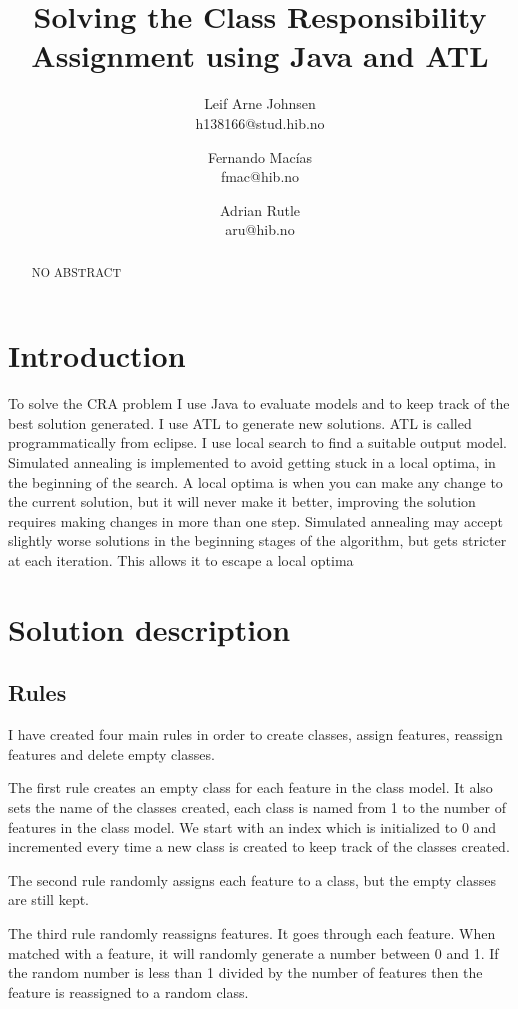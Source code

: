 \documentclass[a4paper]{article}
\title{Solving the Class Responsibility Assignment using Java and ATL}
\author{
Leif Arne Johnsen \\ h138166@stud.hib.no
\and
Fernando Macías \\ fmac@hib.no
\and
Adrian Rutle \\ aru@hib.no
}
\begin{document}
\maketitle

\begin{abstract}
NO ABSTRACT~\cite{Bowman2010}
\end{abstract}


\section{Introduction}

To solve the CRA problem I use Java to evaluate models and to keep track of
the best solution generated.
I use ATL to generate new solutions. ATL is called
programmatically from eclipse.
I use local search to find a suitable output
model.
Simulated annealing is implemented to avoid getting stuck in a local
optima, in the beginning of the search.
A local optima is when you can make
any change to the current solution, but it will never make it better, improving
the solution requires making changes in more than one step.
Simulated
annealing may accept slightly worse solutions in the beginning stages of the
algorithm, but gets stricter at each iteration.
This allows it to escape a local
optima

\section{Solution description}

\subsection{Rules}

I have created four main rules in order to create classes, assign features, reassign features and delete empty classes.

The first rule creates an empty class for each feature in the class model.
It also sets the name of the classes created, each class is named from 1 to the number of features in the class model.
We start with an index which is initialized to 0 and incremented every time a new class is created to keep track of the classes created.

The second rule randomly assigns each feature to a class, but the empty classes are still kept.

The third rule randomly reassigns features.
It goes through each feature.
When matched with a feature, it will randomly generate a number between 0 and 1.
If the random number is less than 1 divided by the number of features then the feature is reassigned to a random class.
\end{document}
